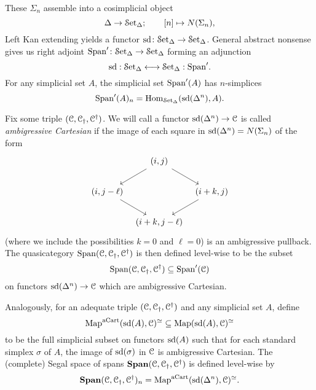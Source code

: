 \documentclass[main.tex]{subfiles}
\begin{document}
These $\Sigma_{n}$ assemble into a cosimplicial object 
\begin{equation*}
  \Delta \to \mathcal{S}\mathrm{et}_{\Delta};\qquad [n] \mapsto N(\Sigma_{n}),
\end{equation*}
Left Kan extending yields a functor $\mathrm{sd}\colon \mathcal{S}\mathrm{et}_{\Delta} \to \mathcal{S}\mathrm{et}_{\Delta}$. General abstract nonsense gives us right adjoint $\mathrm{Span}'\colon \mathcal{S}\mathrm{et}_{\Delta} \to \mathcal{S}\mathrm{et}_{\Delta}$ forming an adjunction
\begin{equation*}
  \mathrm{sd}: \mathcal{S}\mathrm{et}_{\Delta} \longleftrightarrow \mathcal{S}\mathrm{et}_{\Delta} : \mathrm{Span}'.
\end{equation*}
For any simplicial set $A$, the simplicial set $\mathrm{Span}'(A)$ has $n$-simplices
\begin{equation*}
  \mathrm{Span}'(A)_{n} = \mathrm{Hom}_{\mathcal{S}\mathrm{et}_{\Delta}}(\mathrm{sd}(\Delta^{n}), A).
\end{equation*}

Fix some triple $(\mathcal{C}, \mathcal{C}_{\dagger}, \mathcal{C}^{\dagger})$. We will call a functor $\mathrm{sd}(\Delta^{n}) \to \mathcal{C}$ is called \emph{ambigressive Cartesian} if the image of each square in $\mathrm{sd}(\Delta^{n}) = N(\Sigma_{n})$ of the form
\begin{equation*}
  \begin{tikzcd}[column sep=tiny]
    & {(i, j)}
    \arrow[dr]
    \arrow[dl]
    \\
    {(i, j - \ell)}
    \arrow[dr]
    & & {(i + k , j)}
    \arrow[dl]
    \\
    & {(i + k , j - \ell)}
  \end{tikzcd}
\end{equation*}
(where we include the possibilities $k = 0$ and $\ell = 0$) is an ambigressive pullback. The quasicategory $\mathrm{Span}(\mathcal{C}, \mathcal{C}_{\dagger}, \mathcal{C}^{\dagger})$ is then defined level-wise to be the subset
\begin{equation*}
  \mathrm{Span}(\mathcal{C}, \mathcal{C}_{\dagger}, \mathcal{C}^{\dagger}) \subseteq \mathrm{Span}'(\mathcal{C})
\end{equation*}
on functors $\mathrm{sd}(\Delta^{n}) \to \mathcal{C}$ which are ambigressive Cartesian.

Analogously, for an adequate triple $(\mathcal{C}, \mathcal{C}_{\dagger}, \mathcal{C}^{\dagger})$ and any simplicial set $A$, define
\begin{equation*}
  \mathrm{Map}^{\mathrm{aCart}}(\mathrm{sd}(A), \mathcal{C})^{\simeq} \subseteq \mathrm{Map}(\mathrm{sd}(A), \mathcal{C})^{\simeq}
\end{equation*}
to be the full simplicial subset on functors $\mathrm{sd}(A)$ such that for each standard simplex $\sigma$ of $A$, the image of $\mathrm{sd}(\sigma)$ in $\mathcal{C}$ is ambigressive Cartesian. The (complete) Segal space of spans $\mathbf{Span}(\mathcal{C}, \mathcal{C}_{\dagger}, \mathcal{C}^{\dagger})$ is defined level-wise by 
\begin{equation*}
  \mathbf{Span}(\mathcal{C}, \mathcal{C}_{\dagger}, \mathcal{C}^{\dagger})_{n} = \mathrm{Map}^{\mathrm{aCart}}(\mathrm{sd}(\Delta^{n}), \mathcal{C})^{\simeq}.
\end{equation*}
\end{document}
